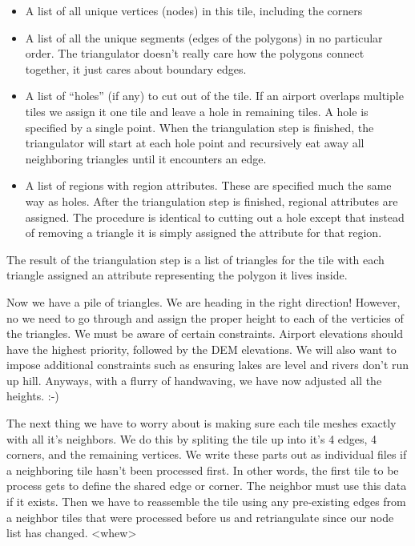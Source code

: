 \documentclass[12pt]{article}
\begin{document}
\begin{itemize}
\item A list of all unique vertices (nodes) in this tile, including
  the corners

\item A list of all the unique segments (edges of the polygons) in no
  particular order.  The triangulator doesn't really care how the
  polygons connect together, it just cares about boundary edges.

\item A list of ``holes'' (if any) to cut out of the tile.  If an
  airport overlaps multiple tiles we assign it one tile and leave a
  hole in remaining tiles.  A hole is specified by a single point.
  When the triangulation step is finished, the triangulator will start
  at each hole point and recursively eat away all neighboring
  triangles until it encounters an edge.

\item A list of regions with region attributes.  These are specified
  much the same way as holes.  After the triangulation step is
  finished, regional attributes are assigned.  The procedure is
  identical to cutting out a hole except that instead of removing a
  triangle it is simply assigned the attribute for that region.
\end{itemize}

The result of the triangulation step is a list of triangles for the
tile with each triangle assigned an attribute representing the polygon
it lives inside.

Now we have a pile of triangles.  We are heading in the right
direction!  However, no we need to go through and assign the proper
height to each of the verticies of the triangles.  We must be aware of
certain constraints.  Airport elevations should have the highest
priority, followed by the DEM elevations.  We will also want to impose
additional constraints such as ensuring lakes are level and rivers
don't run up hill.  Anyways, with a flurry of handwaving, we have now
adjusted all the heights. :-)

The next thing we have to worry about is making sure each tile meshes
exactly with all it's neighbors.  We do this by spliting the tile up
into it's 4 edges, 4 corners, and the remaining vertices.  We write
these parts out as individual files if a neighboring tile hasn't been
processed first.  In other words, the first tile to be process gets to
define the shared edge or corner.  The neighbor must use this data if
it exists.  Then we have to reassemble the tile using any pre-existing
edges from a neighbor tiles that were processed before us and
retriangulate since our node list has changed. <whew>
\end{document}
